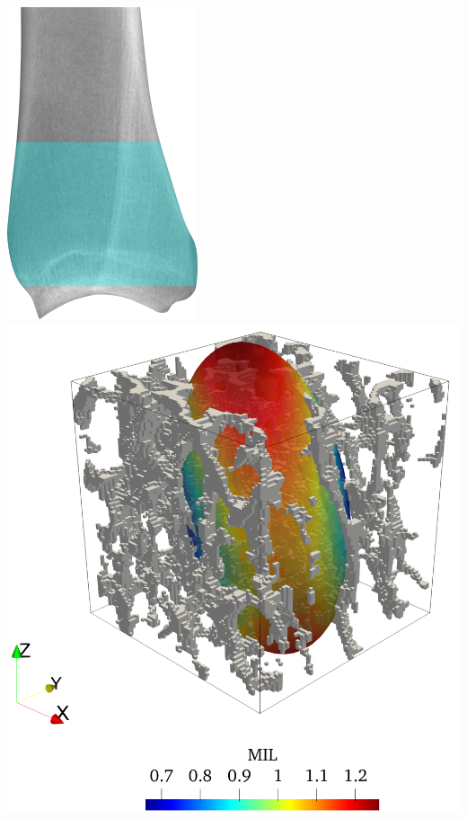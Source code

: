 \documentclass[xcolor=table,11pt]{beamer}
\begin{document}
\begin{frame}
\begin{columns}
			\centering
			\includegraphics[height=0.9\linewidth]{Figures/Clinic}\\
			\includegraphics[width=0.9\linewidth]{Figures/Fabric}

		\end{columns}

	\end{frame}
\end{document}
